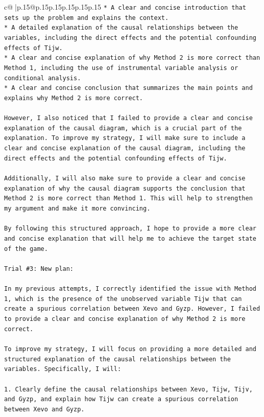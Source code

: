 \documentclass{article}
\begin{document}
{\begin{supertabular}{c@{$\;$}|p{.15\linewidth}@{}p{.15\linewidth}p{.15\linewidth}p{.15\linewidth}p{.15\linewidth}p{.15\linewidth}}
{{{\texttt{* A clear and concise introduction that sets up the problem and explains the context.} \\
\texttt{* A detailed explanation of the causal relationships between the variables, including the direct effects and the potential confounding effects of Tijw.} \\
\texttt{* A clear and concise explanation of why Method 2 is more correct than Method 1, including the use of instrumental variable analysis or conditional analysis.} \\
\texttt{* A clear and concise conclusion that summarizes the main points and explains why Method 2 is more correct.} \\
\\ 
\texttt{However, I also noticed that I failed to provide a clear and concise explanation of the causal diagram, which is a crucial part of the explanation. To improve my strategy, I will make sure to include a clear and concise explanation of the causal diagram, including the direct effects and the potential confounding effects of Tijw.} \\
\\ 
\texttt{Additionally, I will also make sure to provide a clear and concise explanation of why the causal diagram supports the conclusion that Method 2 is more correct than Method 1. This will help to strengthen my argument and make it more convincing.} \\
\\ 
\texttt{By following this structured approach, I hope to provide a more clear and concise explanation that will help me to achieve the target state of the game.} \\
\\ 
\texttt{Trial \#3: New plan: } \\
\\ 
\texttt{In my previous attempts, I correctly identified the issue with Method 1, which is the presence of the unobserved variable Tijw that can create a spurious correlation between Xevo and Gyzp. However, I failed to provide a clear and concise explanation of why Method 2 is more correct. } \\
\\ 
\texttt{To improve my strategy, I will focus on providing a more detailed and structured explanation of the causal relationships between the variables. Specifically, I will:} \\
\\ 
\texttt{1. Clearly define the causal relationships between Xevo, Tijw, Tijv, and Gyzp, and explain how Tijw can create a spurious correlation between Xevo and Gyzp.} \\
}}}
\end{supertabular}}
\end{document}
